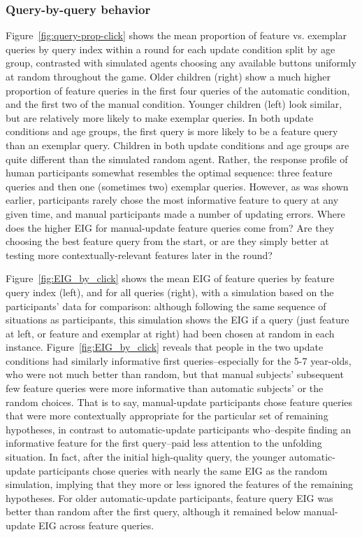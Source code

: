 \documentclass[man,floatsintext]{apa6}
\begin{document}
\subsubsection{Query-by-query behavior}

Figure~\ref{fig:query-prop-click} shows the mean proportion of feature vs. exemplar queries by query index within a round for each update condition split by age group, contrasted with simulated agents choosing any available buttons uniformly at random throughout the game. Older children (right) show a much higher proportion of feature queries in the first four queries of the automatic condition, and the first two of the manual condition. Younger children (left) look similar, but are relatively more likely to make exemplar queries. In both update conditions and age groups, the first query is more likely to be a feature query than an exemplar query. 
Children in both update conditions and age groups are quite different than the simulated random agent. 
Rather, the response profile of human participants somewhat resembles the optimal sequence: three feature queries and then one (sometimes two) exemplar queries. However, as was shown earlier, participants rarely chose the most informative feature to query at any given time, and manual participants made a number of updating errors. Where does the higher EIG for manual-update feature queries come from? Are they choosing the best feature query from the start, or are they simply better at testing more contextually-relevant features later in the round?

Figure~\ref{fig:EIG_by_click} shows the mean EIG of feature queries by feature query index (left), and for all queries (right), with a simulation based on the participants' data for comparison: although following the same sequence of situations as participants, this simulation shows the EIG if a query (just feature at left, or feature and exemplar at right) had been chosen at random in each instance. 
Figure~\ref{fig:EIG_by_click} reveals that people in the two update conditions had similarly informative first queries--especially for the 5-7 year-olds, who were not much better than random, but that manual subjects' subsequent few feature queries were more informative than automatic subjects' or the random choices. That is to say, manual-update participants chose feature queries that were more contextually appropriate for the particular set of remaining hypotheses, in contrast to automatic-update participants who--despite finding an informative feature for the first query--paid less attention to the unfolding situation. In fact, after the initial high-quality query, the younger automatic-update participants chose queries with nearly the same EIG as the random simulation, implying that they more or less ignored the features of the remaining hypotheses. For older automatic-update participants, feature query EIG was better than random after the first query, although it remained below manual-update EIG across feature queries.
\end{document}

